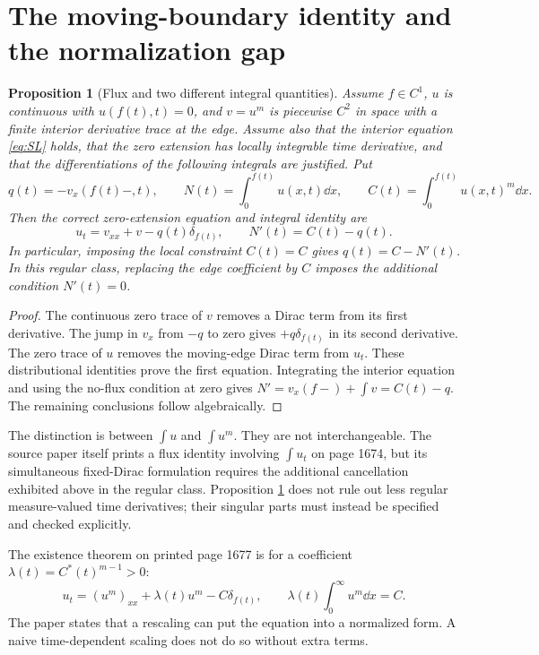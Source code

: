 \documentclass[11pt,a4paper]{article}
\newtheorem{proposition}[theorem]{Proposition}
\theoremstyle{remark}\newtheorem{remark}[theorem]{Remark}
\begin{document}
\section{The moving-boundary identity and the normalization gap}
\begin{proposition}[Flux and two different integral quantities]\label{prop:flux}
Assume $f\in C^1$, $u$ is continuous with $u(f(t),t)=0$, and $v=u^m$ is piecewise $C^2$ in space with a finite interior derivative trace at the edge. Assume also that the interior equation \eqref{eq:SL} holds, that the zero extension has locally integrable time derivative, and that the differentiations of the following integrals are justified. Put
\[
 q(t)=-v_x(f(t)-,t),\qquad
 N(t)=\int_0^{f(t)}u(x,t)\dd x,\qquad
 C(t)=\int_0^{f(t)}u(x,t)^m\dd x.
\]
Then the correct zero-extension equation and integral identity are
\begin{equation}
 u_t=v_{xx}+v-q(t)\delta_{f(t)},\qquad N'(t)=C(t)-q(t).\label{eq:fluxidentity}
\end{equation}
In particular, imposing the local constraint $C(t)=C$ gives $q(t)=C-N'(t)$. In this regular class, replacing the edge coefficient by $C$ imposes the additional condition $N'(t)=0$.
\end{proposition}
\begin{proof}
The continuous zero trace of $v$ removes a Dirac term from its first derivative. The jump in $v_x$ from $-q$ to zero gives $+q\delta_{f(t)}$ in its second derivative. The zero trace of $u$ removes the moving-edge Dirac term from $u_t$. These distributional identities prove the first equation. Integrating the interior equation and using the no-flux condition at zero gives $N'=v_x(f-)+\int v=C(t)-q$. The remaining conclusions follow algebraically.
\end{proof}
The distinction is between $\int u$ and $\int u^m$. They are not interchangeable. The source paper itself prints a flux identity involving $\int u_t$ on page 1674, but its simultaneous fixed-Dirac formulation requires the additional cancellation exhibited above in the regular class. Proposition \ref{prop:flux} does not rule out less regular measure-valued time derivatives; their singular parts must instead be specified and checked explicitly.

The existence theorem on printed page 1677 is for a coefficient $\lambda(t)=C^*(t)^{m-1}>0$:
\begin{equation}
 u_t=(u^m)_{xx}+\lambda(t)u^m-C\delta_{f(t)},\qquad
 \lambda(t)\int_0^\infty u^m\dd x=C.\label{eq:lambda}
\end{equation}
The paper states that a rescaling can put the equation into a normalized form. A naive time-dependent scaling does not do so without extra terms.
\end{document}
